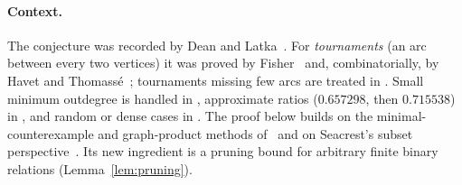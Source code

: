 \documentclass[11pt]{article}
\theoremstyle{remark}
\begin{document}
\paragraph{Context.}
The conjecture was recorded by Dean and Latka~\cite{DeanLatka1995}.
For \emph{tournaments} (an arc between every two vertices) it was proved by
Fisher~\cite{Fisher1996} and, combinatorially, by Havet and
Thomass\'e~\cite{HavetThomasse2000}; tournaments missing few arcs are treated
in \cite{FidlerYuster2007,Ghazal2012,DaraFrancisJacobNarayanan2022,DaamouchAlMninyGhazal2025}.
Small minimum outdegree is handled in
\cite{KanekoLocke2001,SadhukhanSandeepSen2026}, approximate ratios
($0.657298$, then $0.715538$) in \cite{ChenShenYuster2003,HuangPeng2024},
and random or dense cases in
\cite{BotlerMouraNaia2023,EspunyDiazEtAl2025,Brukhman2026}.
The proof below builds on the minimal-counterexample and graph-product
methods of~\cite{BrantnerBrockmanKaySnively2009} and on Seacrest's subset
perspective~\cite{Seacrest2019}.  Its new ingredient is a pruning bound for
arbitrary finite binary relations (Lemma~\ref{lem:pruning}).
\end{document}
